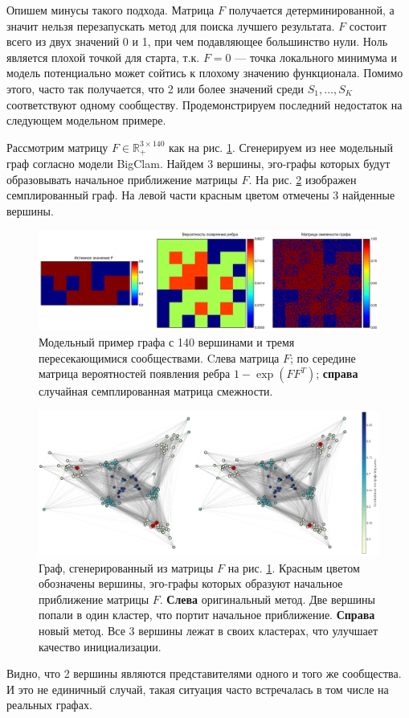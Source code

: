 \documentclass{ITaSconf}
\def\RR{\mathbb{R}}
\begin{document}
Опишем минусы такого подхода. 
Матрица $F$ получается детерминированной, а значит нельзя перезапускать метод для поиска лучшего результата.
$F$ состоит всего из двух значений 0 и 1, при чем подавляющее большинство нули. 
Ноль является плохой точкой для старта, т.к. $F=0$ --- точка локального минимума и модель потенциально может сойтись к плохому значению функционала.
Помимо этого, часто так получается, что 2 или более значений среди $S_1, \dots, S_K$ соответствуют одному сообществу. 
Продемонстрируем последний недостаток на следующем модельном примере.

Рассмотрим матрицу $F\in \RR_{+}^{3\times 140}$ как на рис. \ref{fig:model_ex}. 
Сгенерируем из нее модельный граф согласно модели BigClam. 
Найдем 3 вершины, эго-графы которых будут образовывать начальное приближение матрицы $F$. 
На рис. \ref{fig:model_ex_graph} изображен семплированный граф. 
На левой части красным цветом отмечены 3 найденные вершины.
\begin{figure}[!ht]
	\centering
	\includegraphics[width=\linewidth]{imgs/model_example.png}
	\caption{Модельный пример графа с 140 вершинами и тремя пересекающимися сообществами. Cлева матрица $F$; по середине матрица вероятностей появления ребра $1-\exp(FF^T)$; \textbf{справа} случайная семплированная матрица смежности.}
	\label{fig:model_ex}
\end{figure}
\begin{figure}[!ht]
	\centering
	\includegraphics[width=\linewidth]{imgs/model_example_graph_good_init_pres.png}
	\caption{Граф, сгенерированный из матрицы $F$ на рис. \ref{fig:model_ex}. Красным цветом обозначены вершины, эго-графы которых образуют начальное приближение матрицы $F$. \textbf{Слева} оригинальный метод. Две вершины попали в один кластер, что портит начальное приближение. \textbf{Справа} новый метод. Все 3 вершины лежат в своих кластерах, что улучшает качество инициализации.}
	\label{fig:model_ex_graph}
\end{figure}
Видно, что 2 вершины являются представителями одного и того же сообщества. 
И это не единичный случай, такая ситуация часто встречалась в том числе на реальных графах. 
\end{document}
